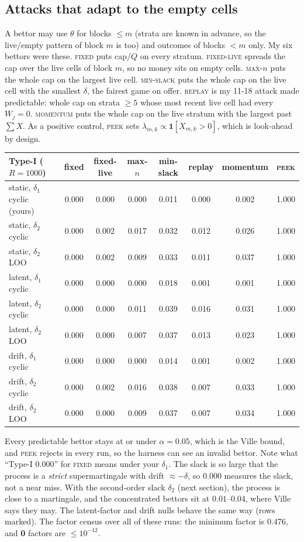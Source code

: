 \documentclass[11pt]{article}
\begin{document}
\subsection{Attacks that adapt to the empty cells}
A bettor may use $\theta$ for blocks $\le m$ (strata are known in advance, so the live/empty pattern of block $m$ is too) and outcomes of blocks $<m$ only. My six bettors were these.
\textsc{fixed} puts cap$/Q$ on every stratum. \textsc{fixed-live} spreads the cap over the live cells of block $m$, so no money sits on empty cells. \textsc{max-$n$} puts the whole cap on the largest live cell. \textsc{min-slack} puts the whole cap on the live cell with the smallest $\delta$, the fairest game on offer.
\textsc{replay} is my 11-18 attack made predictable: whole cap on strata $\ge5$ whose most recent live cell had every $W_j=0$. \textsc{momentum} puts the whole cap on the live stratum with the largest past $\sum X$.
As a positive control, \textsc{peek} sets $\lambda_{m,k}\propto\mathbf 1[X_{m,k}>0]$, which is look-ahead by design.
\begin{center}\small
\begin{tabular}{lcccccc|c}
\toprule
Type-I ($R=1000$) & fixed & fixed-live & max-$n$ & min-slack & replay & momentum & \textsc{peek}\\
\midrule
static, $\delta_1$ cyclic (yours) & 0.000 & 0.000 & 0.000 & 0.011 & 0.000 & 0.002 & 1.000\\
static, $\delta_2$ cyclic & 0.000 & 0.002 & 0.017 & 0.032 & 0.012 & 0.026 & 1.000\\
static, $\delta_2$ LOO & 0.000 & 0.002 & 0.009 & 0.033 & 0.011 & 0.037 & 1.000\\
latent, $\delta_1$ cyclic & 0.000 & 0.000 & 0.000 & 0.018 & 0.001 & 0.001 & 1.000\\
latent, $\delta_2$ cyclic & 0.000 & 0.000 & 0.011 & 0.039 & 0.016 & 0.031 & 1.000\\
latent, $\delta_2$ LOO & 0.000 & 0.000 & 0.007 & 0.037 & 0.013 & 0.023 & 1.000\\
drift, $\delta_1$ cyclic & 0.000 & 0.000 & 0.000 & 0.014 & 0.001 & 0.002 & 1.000\\
drift, $\delta_2$ cyclic & 0.000 & 0.002 & 0.016 & 0.038 & 0.007 & 0.033 & 1.000\\
drift, $\delta_2$ LOO & 0.000 & 0.000 & 0.009 & 0.037 & 0.007 & 0.034 & 1.000\\
\bottomrule
\end{tabular}
\end{center}
Every predictable bettor stays at or under $\alpha=0.05$, which is the Ville bound, and \textsc{peek} rejects in every run, so the harness can see an invalid bettor.
Note what ``Type-I $0.000$'' for \textsc{fixed} means under your $\delta_1$. The slack is so large that the process is a \emph{strict} supermartingale with drift $\approx-\delta$, so $0.000$ measures the slack, not a near miss. With the second-order slack $\delta_2$ (next section), the process is close to a martingale, and the concentrated bettors sit at $0.01$--$0.04$, where Ville says they may.
The latent-factor and drift nulls behave the same way (rows marked).
The factor census over all of these runs: the minimum factor is $0.476$, and \textbf{0} factors are $\le10^{-12}$.
\end{document}
